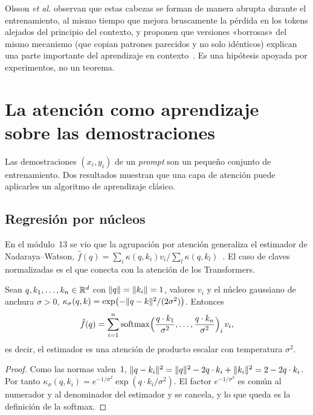 \begin{observacion}
Olsson \emph{et al.} observan que estas cabezas se forman de manera abrupta durante el entrenamiento, al mismo tiempo que mejora bruscamente la pérdida en los tokens alejados del principio del contexto, y proponen que versiones «borrosas» del mismo mecanismo (que copian patrones parecidos y no solo idénticos) explican una parte importante del aprendizaje en contexto~\cite{olsson}. Es una hipótesis apoyada por experimentos, no un teorema.
\end{observacion}

\section{La atención como aprendizaje sobre las demostraciones}

Las demostraciones $(x_i,y_i)$ de un \emph{prompt} son un pequeño conjunto de entrenamiento. Dos resultados muestran que una capa de atención puede aplicarles un algoritmo de aprendizaje clásico.

\subsection{Regresión por núcleos}

En el módulo~13 se vio que la agrupación por atención generaliza el estimador de Nadaraya--Watson, $\hat f(q)=\sum_i\kappa(q,k_i)v_i/\sum_l\kappa(q,k_l)$~\cite[§11.2]{d2l}. El caso de claves normalizadas es el que conecta con la atención de los Transformers.

\begin{proposicion}\label{prop:nw-esfera}
Sean $q,k_1,\dots,k_n\in\mathbb{R}^{d}$ con $\lVert q\rVert=\lVert k_i\rVert=1$, valores $v_i$ y el núcleo gaussiano de anchura $\sigma>0$, $\kappa_\sigma(q,k)=\exp\bigl(-\lVert q-k\rVert^{2}/(2\sigma^{2})\bigr)$. Entonces
\[
\hat f(q)=\sum_{i=1}^{n}\operatorname{softmax}\Bigl(\frac{q\cdot k_1}{\sigma^{2}},\dots,\frac{q\cdot k_n}{\sigma^{2}}\Bigr)_i\,v_i ,
\]
es decir, el estimador es una atención de producto escalar con temperatura $\sigma^{2}$.
\end{proposicion}

\begin{proof}
Como las normas valen~1, $\lVert q-k_i\rVert^{2}=\lVert q\rVert^{2}-2q\cdot k_i+\lVert k_i\rVert^{2}=2-2q\cdot k_i$. Por tanto $\kappa_\sigma(q,k_i)=e^{-1/\sigma^{2}}\exp(q\cdot k_i/\sigma^{2})$. El factor $e^{-1/\sigma^{2}}$ es común al numerador y al denominador del estimador y se cancela, y lo que queda es la definición de la softmax.
\end{proof}

